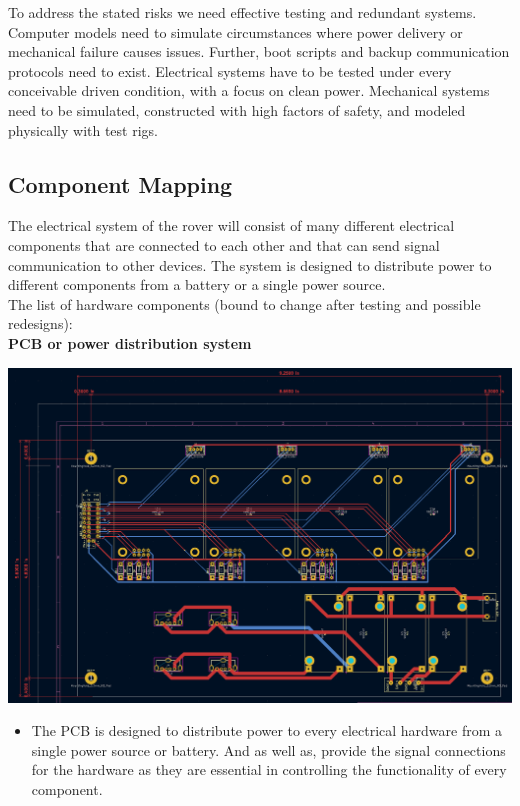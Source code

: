 \documentclass[a4paper, 10pt]{article}
\begin{document}
	To address the stated risks we need effective testing and redundant systems. Computer models need to simulate circumstances where power delivery or mechanical failure causes issues. Further, boot scripts and backup communication protocols need to exist. Electrical systems have to be tested under every conceivable driven condition, with a focus on clean power. Mechanical systems need to be simulated, constructed with high factors of safety, and modeled physically with test rigs.
 	
 	\subsection{Component Mapping}
 	The electrical system of the rover will consist of many different electrical components that are connected to each other and that can send signal communication to other devices. The system is designed to distribute power to different components from a battery or a single power source. \\
	
The list of hardware components (bound to change after testing and possible redesigns): \\

\textbf{PCB or power distribution system}

\includegraphics[scale=0.15]{Rover PCB}

\begin{itemize}
\item
	The PCB is designed to distribute power to every electrical hardware from a single power source or battery. And as well as, provide the signal connections for the hardware as they are essential in controlling the functionality of every component.
\end{itemize}
\end{document}
